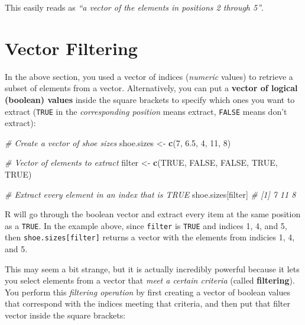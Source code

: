 \documentclass[]{book}
\newenvironment{Shaded}{\begin{snugshade}}{\end{snugshade}}
\newcommand{\KeywordTok}[1]{\textcolor[rgb]{0.13,0.29,0.53}{\textbf{#1}}}
\newcommand{\DecValTok}[1]{\textcolor[rgb]{0.00,0.00,0.81}{#1}}
\newcommand{\FloatTok}[1]{\textcolor[rgb]{0.00,0.00,0.81}{#1}}
\newcommand{\StringTok}[1]{\textcolor[rgb]{0.31,0.60,0.02}{#1}}
\newcommand{\CommentTok}[1]{\textcolor[rgb]{0.56,0.35,0.01}{\textit{#1}}}
\newcommand{\OtherTok}[1]{\textcolor[rgb]{0.56,0.35,0.01}{#1}}
\newcommand{\NormalTok}[1]{#1}
\theoremstyle{definition}
\theoremstyle{definition}
\theoremstyle{remark}
\begin{document}
This easily reads as \emph{``a vector of the elements in positions 2
through 5''}.

\section{Vector Filtering}\label{vector-filtering}

In the above section, you used a vector of indices (\emph{numeric}
values) to retrieve a subset of elements from a vector. Alternatively,
you can put a \textbf{vector of logical (boolean) values} inside the
square brackets to specify which ones you want to extract (\texttt{TRUE}
in the \emph{corresponding position} means extract, \texttt{FALSE} means
don't extract):

\begin{Shaded}
\begin{Highlighting}[]
\CommentTok{# Create a vector of shoe sizes}
\NormalTok{shoe.sizes <-}\StringTok{ }\KeywordTok{c}\NormalTok{(}\DecValTok{7}\NormalTok{, }\FloatTok{6.5}\NormalTok{, }\DecValTok{4}\NormalTok{, }\DecValTok{11}\NormalTok{, }\DecValTok{8}\NormalTok{)}

\CommentTok{# Vector of elements to extract}
\NormalTok{filter <-}\StringTok{ }\KeywordTok{c}\NormalTok{(}\OtherTok{TRUE}\NormalTok{, }\OtherTok{FALSE}\NormalTok{, }\OtherTok{FALSE}\NormalTok{, }\OtherTok{TRUE}\NormalTok{, }\OtherTok{TRUE}\NormalTok{)}

\CommentTok{# Extract every element in an index that is TRUE}
\NormalTok{shoe.sizes[filter]  }\CommentTok{# [1]  7 11  8}
\end{Highlighting}
\end{Shaded}

R will go through the boolean vector and extract every item at the same
position as a \texttt{TRUE}. In the example above, since \texttt{filter}
is \texttt{TRUE} and indices 1, 4, and 5, then
\texttt{shoe.sizes{[}filter{]}} returns a vector with the elements from
indicies 1, 4, and 5.

This may seem a bit strange, but it is actually incredibly powerful
because it lets you select elements from a vector that \emph{meet a
certain criteria} (called \textbf{filtering}). You perform this
\emph{filtering operation} by first creating a vector of boolean values
that correspond with the indices meeting that criteria, and then put
that filter vector inside the square brackets:
\end{document}

